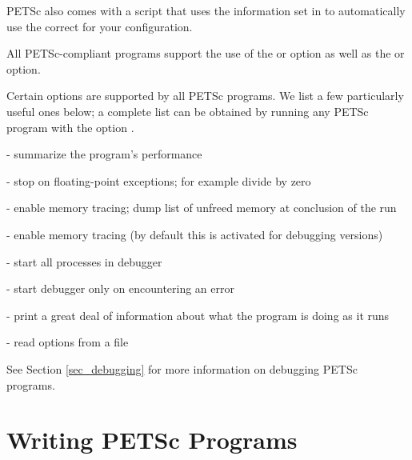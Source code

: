PETSc also comes with a script
that uses the information set in  to
automatically use the correct  for your configuration.

All PETSc-compliant programs support the use of the 
 or  option as well as the  
or  option.

Certain options are supported by all PETSc programs.  We list a few
particularly useful ones below; a complete list can be obtained by
running any PETSc program with the option .
\begin{tightitemize}
\item {} - summarize the program's performance
\item {} - stop on floating-point exceptions; 
      for example divide by zero
\item {} - enable memory tracing; dump list of unfreed memory
      at conclusion  of the run
\item {} - enable memory tracing (by default this is
      activated for debugging versions)
\item {}  
     - start all processes in debugger  
\item {}  
       - start debugger only on encountering an error
\item {} - print a great deal of information about what the program is doing as it runs
\item {}  - read options from a file
\end{tightitemize}
See Section \ref{sec_debugging} for more information on debugging PETSc programs.

\section{Writing PETSc Programs}
\label{sec_writing}

